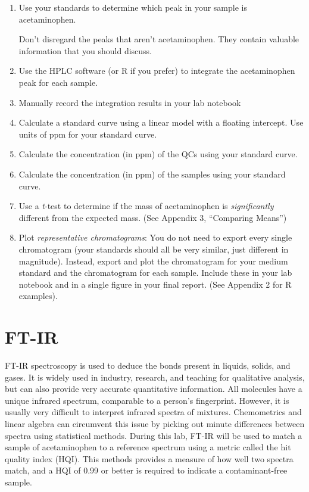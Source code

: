 \documentclass[]{tufte-book}
\providecommand{\tightlist}{%
  \setlength{\itemsep}{0pt}\setlength{\parskip}{0pt}}
\begin{document}
\begin{enumerate}
\def\labelenumi{\arabic{enumi}.}
\tightlist
\item
  Use your standards to determine which peak in your sample is acetaminophen.

  \begin{marginfigure}
    Don't disregard the peaks that aren't acetaminophen. They contain
    valuable information that you should discuss.
    \end{marginfigure}
\item
  Use the HPLC software (or R if you prefer) to integrate the acetaminophen peak for each sample.
\item
  Manually record the integration results in your lab notebook
\item
  Calculate a standard curve using a linear model with a floating intercept. Use units of ppm for your standard curve.
\item
  Calculate the concentration (in ppm) of the QCs using your standard curve.
\item
  Calculate the concentration (in ppm) of the samples using your standard curve.
\item
  Use a \emph{t}-test to determine if the mass of acetaminophen is \emph{significantly} different from the expected mass. (See Appendix 3, ``Comparing Means'')
\item
  Plot \emph{representative chromatograms}: You do not need to export every single chromatogram (your standards should all be very similar, just different in magnitude). Instead, export and plot the chromatogram for your medium standard and the chromatogram for each sample. Include these in your lab notebook and in a single figure in your final report. (See Appendix 2 for R examples).
\end{enumerate}

\newpage

\hypertarget{am-ftir}{%
\section{FT-IR}\label{am-ftir}}

FT-IR spectroscopy is used to deduce the bonds present in liquids, solids, and gases. It is widely used in industry, research, and teaching for qualitative analysis, but can also provide very accurate quantitative information. All molecules have a unique infrared spectrum, comparable to a person's fingerprint. However, it is usually very difficult to interpret infrared spectra of mixtures. Chemometrics and linear algebra can circumvent this issue by picking out minute differences between spectra using statistical methods. During this lab, FT-IR will be used to match a sample of acetaminophen to a reference spectrum using a metric called the hit quality index (HQI). This methods provides a measure of how well two spectra match, and a HQI of 0.99 or better is required to indicate a contaminant-free sample.
\end{document}
